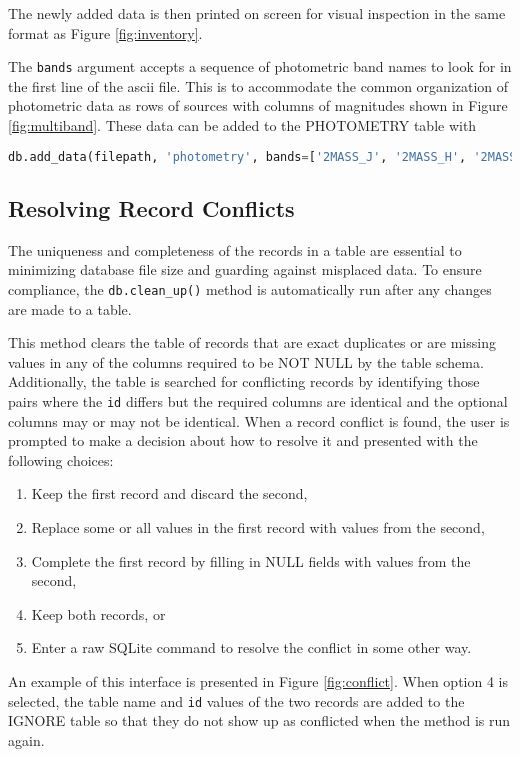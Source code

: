 \documentclass[iop,revtex4,natbib209]{emulateapj}
\begin{document}
The newly added data is then printed on screen for visual inspection in the same format as Figure \ref{fig:inventory}.

The \texttt{bands} argument accepts a sequence of photometric band names to look for in the first line of the ascii file. This is to accommodate the common organization of photometric data as rows of sources with columns of magnitudes shown in Figure \ref{fig:multiband}. These data can be added to the PHOTOMETRY table with 

\begin{lstlisting}[language=Python]
db.add_data(filepath, 'photometry', bands=['2MASS_J', '2MASS_H', '2MASS_Ks'])
\end{lstlisting}

\subsection{Resolving Record Conflicts}{\label{sec:clean_up}}

The uniqueness and completeness of the records in a table are essential to minimizing database file size and guarding against misplaced data. To ensure compliance, the \texttt{db.clean\_up()} method is automatically run after any changes are made to a table.

This method clears the table of records that are exact duplicates or are missing values in any of the columns required to be NOT NULL by the table schema. Additionally, the table is searched for conflicting records by identifying those pairs where the \texttt{id} differs but the required columns are identical and the optional columns may or may not be identical. When a record conflict is found, the user is prompted to make a decision about how to resolve it and presented with the following choices:

\begin{enumerate}
\item Keep the first record and discard the second,
\item Replace some or all values in the first record with values from the second,
\item Complete the first record by filling in NULL fields with values from the second, 
\item Keep both records, or
\item Enter a raw SQLite command to resolve the conflict in some other way.
\end{enumerate}

An example of this interface is presented in Figure \ref{fig:conflict}. When option 4 is selected, the table name and \texttt{id} values of the two records are added to the IGNORE table so that they do not show up as conflicted when the method is run again.
\end{document}
